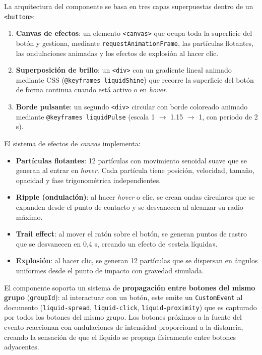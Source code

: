 La arquitectura del componente se basa en tres capas superpuestas dentro de un \texttt{<button>}:
\begin{enumerate}
\item \textbf{Canvas de efectos}: un elemento \texttt{<canvas>} que ocupa toda la superficie del botón y gestiona, mediante \texttt{requestAnimationFrame}, las partículas flotantes, las ondulaciones animadas y los efectos de explosión al hacer clic.
\item \textbf{Superposición de brillo}: un \texttt{<div>} con un gradiente lineal animado mediante CSS (\texttt{@keyframes liquidShine}) que recorre la superficie del botón de forma continua cuando está activo o en \textit{hover}.
\item \textbf{Borde pulsante}: un segundo \texttt{<div>} circular con borde coloreado animado mediante \texttt{@keyframes liquidPulse} (escala 1 $\rightarrow$ 1.15 $\rightarrow$ 1, con periodo de 2 s).
\end{enumerate}

El sistema de efectos de \textit{canvas} implementa:
\begin{itemize}
\item \textbf{Partículas flotantes}: 12 partículas con movimiento senoidal suave que se generan al entrar en \textit{hover}. Cada partícula tiene posición, velocidad, tamaño, opacidad y fase trigonométrica independientes.
\item \textbf{Ripple (ondulación)}: al hacer \textit{hover} o clic, se crean ondas circulares que se expanden desde el punto de contacto y se desvanecen al alcanzar su radio máximo.
\item \textbf{Trail effect}: al mover el ratón sobre el botón, se generan puntos de rastro que se desvanecen en 0,4 s, creando un efecto de «estela líquida».
\item \textbf{Explosión}: al hacer clic, se generan 12 partículas que se dispersan en ángulos uniformes desde el punto de impacto con gravedad simulada.
\end{itemize}

El componente soporta un sistema de \textbf{propagación entre botones del mismo grupo} (\texttt{groupId}): al interactuar con un botón, este emite un \texttt{CustomEvent} al documento (\texttt{liquid-spread}, \texttt{liquid-click}, \texttt{liquid-proximity}) que es capturado por todos los botones del mismo grupo. Los botones próximos a la fuente del evento reaccionan con ondulaciones de intensidad proporcional a la distancia, creando la sensación de que el líquido se propaga físicamente entre botones adyacentes.

